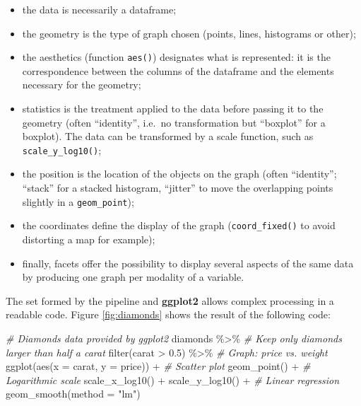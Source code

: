 \documentclass[
  12pt,
  american,
  a4paper,
  extrafontsizes,onecolumn,openright
  ]{memoir}
\newenvironment{Shaded}{\begin{snugshade}}{\end{snugshade}}
\newcommand{\AttributeTok}[1]{\textcolor[rgb]{0.77,0.63,0.00}{#1}}
\newcommand{\CommentTok}[1]{\textcolor[rgb]{0.56,0.35,0.01}{\textit{#1}}}
\newcommand{\FloatTok}[1]{\textcolor[rgb]{0.00,0.00,0.81}{#1}}
\newcommand{\FunctionTok}[1]{\textcolor[rgb]{0.00,0.00,0.00}{#1}}
\newcommand{\NormalTok}[1]{#1}
\newcommand{\SpecialCharTok}[1]{\textcolor[rgb]{0.00,0.00,0.00}{#1}}
\newcommand{\StringTok}[1]{\textcolor[rgb]{0.31,0.60,0.02}{#1}}
\providecommand{\tightlist}{%
  \setlength{\itemsep}{0pt}\setlength{\parskip}{0pt}}
\begin{document}
\begin{itemize}
\tightlist
\item
  the data is necessarily a dataframe;
\item
  the geometry is the type of graph chosen (points, lines, histograms or other);
\item
  the aesthetics (function \texttt{aes()}) designates what is represented: it is the correspondence between the columns of the dataframe and the elements necessary for the geometry;
\item
  statistics is the treatment applied to the data before passing it to the geometry (often \enquote{identity}, i.e.~no transformation but \enquote{boxplot} for a boxplot).
  The data can be transformed by a scale function, such as \texttt{scale\_y\_log10()};
\item
  the position is the location of the objects on the graph (often \enquote{identity}; \enquote{stack} for a stacked histogram, \enquote{jitter} to move the overlapping points slightly in a \texttt{geom\_point});
\item
  the coordinates define the display of the graph (\texttt{coord\_fixed()} to avoid distorting a map for example);
\item
  finally, facets offer the possibility to display several aspects of the same data by producing one graph per modality of a variable.
\end{itemize}

The set formed by the pipeline and \textbf{ggplot2} allows complex processing in a readable code.
Figure \ref{fig:diamonds} shows the result of the following code:



\scriptsize

\begin{Shaded}
\begin{Highlighting}[]
\CommentTok{\# Diamonds data provided by ggplot2}
\NormalTok{diamonds }\SpecialCharTok{\%\textgreater{}\%} 
  \CommentTok{\# Keep only diamonds larger than half a carat}
  \FunctionTok{filter}\NormalTok{(carat }\SpecialCharTok{\textgreater{}} \FloatTok{0.5}\NormalTok{) }\SpecialCharTok{\%\textgreater{}\%} 
  \CommentTok{\# Graph: price vs. weight}
  \FunctionTok{ggplot}\NormalTok{(}\FunctionTok{aes}\NormalTok{(}\AttributeTok{x =}\NormalTok{ carat, }\AttributeTok{y =}\NormalTok{ price)) }\SpecialCharTok{+}
    \CommentTok{\# Scatter plot}
    \FunctionTok{geom\_point}\NormalTok{() }\SpecialCharTok{+} 
    \CommentTok{\# Logarithmic scale}
    \FunctionTok{scale\_x\_log10}\NormalTok{() }\SpecialCharTok{+} 
    \FunctionTok{scale\_y\_log10}\NormalTok{() }\SpecialCharTok{+} 
    \CommentTok{\# Linear regression}
    \FunctionTok{geom\_smooth}\NormalTok{(}\AttributeTok{method =} \StringTok{"lm"}\NormalTok{)}
\end{Highlighting}
\end{Shaded}
\end{document}
